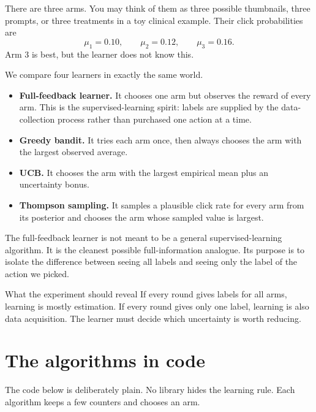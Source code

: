 \documentclass[en,nofont,11pt]{elegantbook}
\begin{document}
There are three arms. You may think of them as three possible thumbnails, three prompts, or three treatments in a toy clinical example. Their click probabilities are
\[
\mu_1=0.10,\qquad \mu_2=0.12,\qquad \mu_3=0.16.
\]
Arm $3$ is best, but the learner does not know this.

We compare four learners in exactly the same world.

\begin{itemize}
  \item \textbf{Full-feedback learner.} It chooses one arm but observes the reward of every arm. This is the supervised-learning spirit: labels are supplied by the data-collection process rather than purchased one action at a time.
  \item \textbf{Greedy bandit.} It tries each arm once, then always chooses the arm with the largest observed average.
  \item \textbf{UCB.} It chooses the arm with the largest empirical mean plus an uncertainty bonus.
  \item \textbf{Thompson sampling.} It samples a plausible click rate for every arm from its posterior and chooses the arm whose sampled value is largest.
\end{itemize}

The full-feedback learner is not meant to be a general supervised-learning algorithm. It is the cleanest possible full-information analogue. Its purpose is to isolate the difference between seeing all labels and seeing only the label of the action we picked.

\begin{plainbox}{What the experiment should reveal}
If every round gives labels for all arms, learning is mostly estimation. If every round gives only one label, learning is also data acquisition. The learner must decide which uncertainty is worth reducing.
\end{plainbox}

\section{The algorithms in code}

The code below is deliberately plain. No library hides the learning rule. Each algorithm keeps a few counters and chooses an arm.
\end{document}
